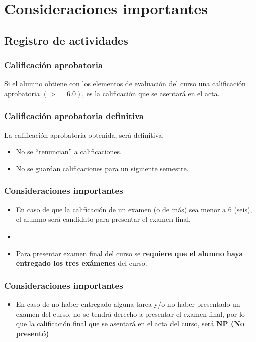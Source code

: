 \documentclass[12pt]{beamer}
\begin{document}
\section{Consideraciones importantes}
\subsection{Registro de actividades}

\begin{frame}
\frametitle{Calificación aprobatoria}
Si el alumno obtiene con los elementos de evaluación del curso una calificación aprobatoria $(>= 6.0)$, \pause es la calificación que se asentará en el acta.
\end{frame}
\begin{frame}
\frametitle{Calificación aprobatoria definitiva}
La calificación aprobatoria obtenida, será definitiva.
\begin{itemize}[<+->]
\setlength{\itemsep}{0mm}
\item[\ding{55}] No se \enquote{renuncian} a calificaciones.
\item[\ding{55}] No se guardan calificaciones para un siguiente semestre.
\end{itemize}
\end{frame}
\begin{frame}
\frametitle{Consideraciones importantes}
\begin{itemize}[<+->]
\setlength{\itemsep}{0mm}
\item[\ding{51}] En caso de que la calificación de un examen (o de más) sea menor a $6$ (seis), el alumno será candidato para presentar el examen final.
\item[\ding{51}] 
\item[\ding{51}] Para presentar examen final del curso se \textbf{requiere que el alumno haya entregado los tres exámenes} del curso.
\end{itemize}
\end{frame}
\begin{frame}
\frametitle{Consideraciones importantes}
\begin{itemize}[<+->]
\setlength{\itemsep}{0mm}
\item[\ding{43}] En caso de no haber entregado alguna tarea y/o no haber presentado un examen del curso, no se tendrá derecho a presentar el examen final, por lo que la calificación final que se asentará en el acta del curso, será \textbf{NP (No presentó)}.
\end{itemize}
\end{frame}
\end{document}
